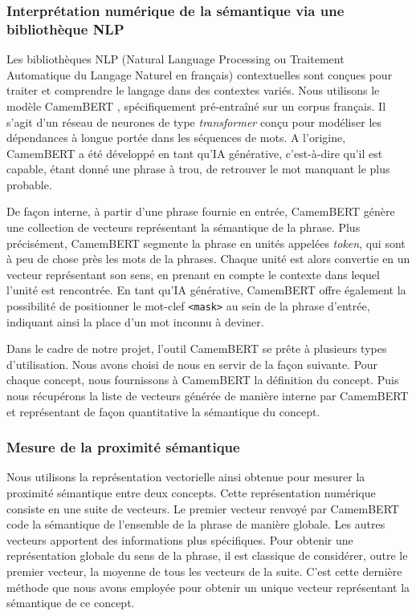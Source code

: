 \documentclass{amsart}
\begin{document}
\subsubsection{Interprétation numérique de la sémantique via une bibliothèque NLP}
Les bibliothèques NLP (Natural Language Processing ou Traitement Automatique du Langage Naturel en français) contextuelles sont conçues pour traiter et comprendre le langage dans des contextes variés. Nous utilisons le modèle CamemBERT \cite{martin-etal-2020-camembert, martin:hal-02784755}, spécifiquement pré-entraîné sur un corpus français. Il s'agit d'un réseau de neurones de type \textit{transformer} conçu pour modéliser les dépendances à longue portée dans les séquences de mots. A l'origine, CamemBERT a été développé en tant qu'IA générative, c'est-à-dire qu'il est capable, étant donné une phrase à trou, de retrouver le mot manquant le plus probable.

De façon interne, à partir d'une phrase fournie en entrée, CamemBERT génère une collection de vecteurs représentant la sémantique de la phrase. Plus précisément, CamemBERT segmente la phrase en unités appelées \textit{token}, qui sont à peu de chose près les mots de la phrases. Chaque unité est alors convertie en un vecteur représentant son sens, en prenant en compte le contexte dans lequel l'unité est rencontrée. En tant qu'IA générative, CamemBERT offre également la possibilité de positionner le mot-clef \verb|<mask>| au sein de la phrase d'entrée, indiquant ainsi la place d'un mot inconnu à deviner.

Dans le cadre de notre projet, l'outil CamemBERT se prête à plusieurs types d'utilisation. Nous avons choisi de nous en servir de la façon suivante. Pour chaque concept, nous fournissons à CamemBERT la définition du concept. Puis nous récupérons la liste de vecteurs générée de manière interne par CamemBERT et représentant de façon quantitative la sémantique du concept.

\subsubsection{Mesure de la proximité sémantique}
Nous utilisons la représentation vectorielle ainsi obtenue pour mesurer la proximité sémantique entre deux concepts. Cette représentation numérique consiste en une suite de vecteurs. Le premier vecteur renvoyé par CamemBERT code la sémantique de l'ensemble de la phrase de manière globale. Les autres vecteurs apportent des informations plus spécifiques. Pour obtenir une représentation globale du sens de la phrase, il est classique de considérer, outre le premier vecteur, la moyenne de tous les vecteurs de la suite. C'est cette dernière méthode que nous avons employée pour obtenir un unique vecteur représentant la sémantique de ce concept.
\end{document}
